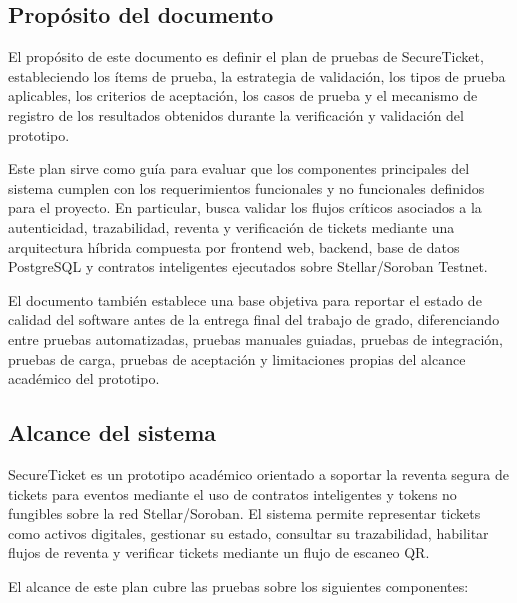 \documentclass[12pt,letterpaper]{article}
\newcommand{\NombreProyecto}{SecureTicket}
\begin{document}
\subsection{Propósito del documento}

El propósito de este documento es definir el plan de pruebas de \NombreProyecto{}, estableciendo los ítems de prueba, la estrategia de validación, los tipos de prueba aplicables, los criterios de aceptación, los casos de prueba y el mecanismo de registro de los resultados obtenidos durante la verificación y validación del prototipo.

Este plan sirve como guía para evaluar que los componentes principales del sistema cumplen con los requerimientos funcionales y no funcionales definidos para el proyecto. En particular, busca validar los flujos críticos asociados a la autenticidad, trazabilidad, reventa y verificación de tickets mediante una arquitectura híbrida compuesta por frontend web, backend, base de datos PostgreSQL y contratos inteligentes ejecutados sobre Stellar/Soroban Testnet.

El documento también establece una base objetiva para reportar el estado de calidad del software antes de la entrega final del trabajo de grado, diferenciando entre pruebas automatizadas, pruebas manuales guiadas, pruebas de integración, pruebas de carga, pruebas de aceptación y limitaciones propias del alcance académico del prototipo.

\subsection{Alcance del sistema}

\NombreProyecto{} es un prototipo académico orientado a soportar la reventa segura de tickets para eventos mediante el uso de contratos inteligentes y tokens no fungibles sobre la red Stellar/Soroban. El sistema permite representar tickets como activos digitales, gestionar su estado, consultar su trazabilidad, habilitar flujos de reventa y verificar tickets mediante un flujo de escaneo QR.

El alcance de este plan cubre las pruebas sobre los siguientes componentes:
\end{document}
